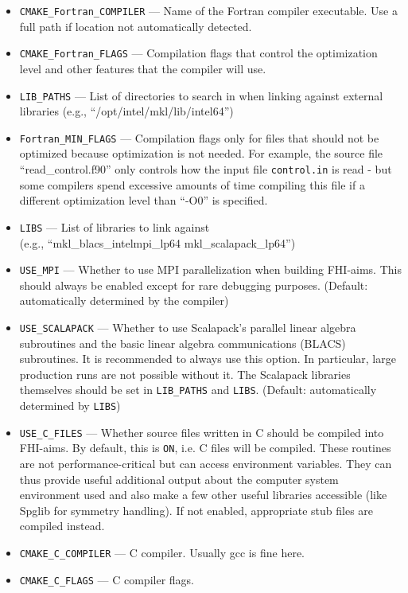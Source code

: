 \begin{itemize}
\item \texttt{CMAKE\_Fortran\_COMPILER} --- Name of the Fortran compiler executable. Use a full path if location not automatically detected.
\item \texttt{CMAKE\_Fortran\_FLAGS} ---  Compilation flags that control the optimization level and other features that the compiler will use. \item \texttt{LIB\_PATHS} --- List of directories to search in when linking against external libraries (e.g., ``/opt/intel/mkl/lib/intel64'')
\item \texttt{Fortran\_MIN\_FLAGS} --- Compilation flags only for
  files that should not be optimized because optimization is not
  needed. For example, the source file ``read\_control.f90'' only
  controls how the input file \texttt{control.in} is read - but some
  compilers spend excessive amounts of time compiling this file if a
  different optimization level than ``-O0'' is specified.
\item \texttt{LIBS} --- List of libraries to link against \\
  (e.g., ``mkl\_blacs\_intelmpi\_lp64 mkl\_scalapack\_lp64'')
\item \texttt{USE\_MPI} ---  Whether to use MPI parallelization when building FHI-aims. This should always be enabled except for rare debugging purposes. (Default: automatically determined by the compiler)
\item \texttt{USE\_SCALAPACK} --- Whether to use Scalapack's parallel linear algebra subroutines and the basic linear algebra communications (BLACS) subroutines. It is recommended to always use this option. In particular, large production runs are not possible without it. The Scalapack libraries themselves should be set in \texttt{LIB\_PATHS} and \texttt{LIBS}. (Default: automatically determined by \texttt{LIBS})
\item \texttt{USE\_C\_FILES} ---  Whether source files written in C should be compiled into FHI-aims.  By default, this is \texttt{ON}, i.e. C files will be compiled.  These routines are not performance-critical but can access environment variables. They can thus provide useful additional output about the computer system environment used and also make a few other useful libraries accessible (like Spglib for symmetry handling). If not enabled, appropriate stub files are compiled instead.
\item \texttt{CMAKE\_C\_COMPILER} --- C compiler. Usually gcc is fine here.
\item \texttt{CMAKE\_C\_FLAGS} --- C compiler flags.

\end{itemize}
